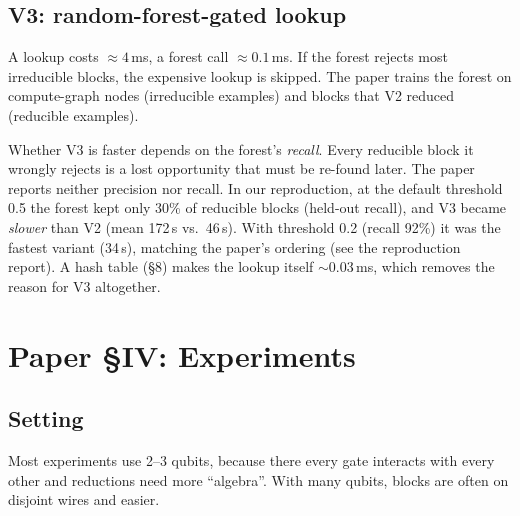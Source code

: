 \documentclass[11pt,a4paper]{article}
\begin{document}
\subsection{V3: random-forest-gated lookup}\label{sec:v3}
A lookup costs $\approx4$\,ms, a forest call $\approx0.1$\,ms. If the forest rejects most irreducible blocks, the expensive lookup
is skipped. The paper trains the forest on compute-graph nodes (irreducible examples) and blocks that V2 reduced
(reducible examples).
\begin{careful}
Whether V3 is faster depends on the forest's \emph{recall}. Every reducible block it wrongly rejects is a lost opportunity
that must be re-found later. The paper reports neither precision nor recall. In our reproduction, at the default
threshold 0.5 the forest kept only 30\% of reducible blocks (held-out recall), and V3 became \emph{slower} than V2
(mean 172\,s vs.\ 46\,s). With threshold 0.2 (recall 92\%) it was the fastest variant (34\,s), matching the paper's ordering
(see the reproduction report). A hash table (\S8) makes the lookup itself $\sim$0.03\,ms, which
removes the reason for V3 altogether.
\end{careful}

\section{Paper \S IV: Experiments}
\subsection{Setting}
Most experiments use 2--3 qubits, because there every gate interacts with every other and reductions need more ``algebra''.
With many qubits, blocks are often on disjoint wires and easier.
\end{document}
